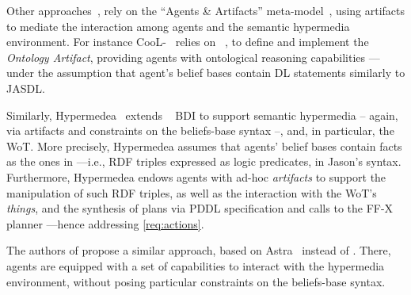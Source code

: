 \documentclass[
]{ceurart}
\begin{document}
%
Other approaches~\cite{DBLP:journals/wias/MascardiABBR14,DBLP:conf/www/CharpenayZLB22, DBLP:conf/semweb/ONeillBBC21, DBLP:conf/emas/CiorteaBR18},
rely on the ``Agents \& Artifacts'' meta-model~\cite{DBLP:conf/promas/RicciVO05},
using artifacts to mediate the interaction among agents and the semantic hypermedia environment.
%
For instance
CooL-\agentspeak{}~\cite{DBLP:journals/wias/MascardiABBR14} relies on \cartago{}~\cite{DBLP:books/sp/09/RicciPVO09},
to define and implement the \emph{Ontology Artifact},
providing agents with ontological reasoning capabilities%
---under the assumption that agent's belief bases contain \ac{DL} statements similarly to JASDL.

Similarly, 
Hypermedea~\cite{DBLP:conf/www/CharpenayZLB22} extends \jacamo{}~\cite{BOISSIER2013747} \ac{BDI} to support semantic hypermedia
-- again, via artifacts and constraints on the beliefs-base syntax --,
and, in particular, the \ac{WoT}.
%
More precisely,
Hypermedea assumes that agents' belief bases contain facts as the ones in %
---i.e., \ac{RDF} triples expressed as logic predicates,
in Jason's syntax.
%
Furthermore, 
Hypermedea endows agents with ad-hoc \emph{artifacts} 
to support the manipulation of such \ac{RDF} triples,
as well as the interaction with the \acs{WoT}'s \emph{things},
and the synthesis of plans via PDDL specification and calls to the FF-X planner\missingref{}%
---hence addressing \ref{req:actions}.
%

%
The authors of \cite{DBLP:conf/semweb/ONeillBBC21}
propose a similar approach, based on Astra~\cite{CollierRL15} instead of \jacamo{}.
%
There,
agents are equipped with a set of capabilities to interact with the hypermedia environment,
without posing particular constraints on the beliefs-base syntax.
\end{document}
